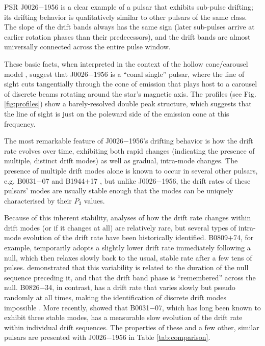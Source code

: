 \documentclass[linenumbers]{aastex631}
\newcommand{\psr}{J0026$-$1956}
\begin{document}
PSR \psr{} is a clear example of a pulsar that exhibits sub-pulse drifting; its drifting behavior is qualitatively similar to other pulsars of the same class.
The slope of the drift bands always has the same sign (later sub-pulses arrive at earlier rotation phases than their predecessors), and the drift bands are almost universally connected across the entire pulse window.

These basic facts, when interpreted in the context of the hollow cone/carousel model \citep{Ruderman1975,Rankin1986,Deshpande1999}, suggest that \psr{} is a ``conal single'' pulsar, where the line of sight cuts tangentially through the cone of emission that plays host to a carousel of discrete beams rotating around the star's magnetic axis.
The profiles (see Fig. \ref{fig:profiles}) show a barely-resolved double peak structure, which suggests that the line of sight is just on the poleward side of the emission cone at this frequency.

The most remarkable feature of \psr{}'s drifting behavior is how the drift rate evolves over time, exhibiting both rapid changes (indicating the presence of multiple, distinct drift modes) as well as gradual, intra-mode changes.
The presence of multiple drift modes alone is known to occur in several other pulsars, e.g. B0031$-$07 \citep{Huguenin1970,Joshi2000} and B1944$+$17 \citep{Deich1986,Kloumann2010}, but unlike \psr{}, the drift rates of these pulsars' modes are usually stable enough that the modes can be uniquely characterised by their $P_3$ values.

Because of this inherent stability, analyses of how the drift rate changes within drift modes (or if it changes at all) are relatively rare, but several types of intra-mode evolution of the drift rate have been historically identified.
B0809$+$74, for example, temporarily adopts a slightly lower drift rate immediately following a null, which then relaxes slowly back to the usual, stable rate after a few tens of pulses.
\citet{Lyne1983} demonstrated that this variability is related to the duration of the null sequence preceding it, and that the drift band phase is ``remembered'' across the null.
B0826$-$34, in contrast, has a drift rate that varies slowly but pseudo randomly at all times, making the identification of discrete drift modes impossible \citep[e.g.][]{Esamdin2012}.
More recently, \citet{McSweeney2017} showed that B0031$-$07, which has long been known to exhibit three stable modes, has a measurable slow evolution of the drift rate within individual drift sequences.
The properties of these and a few other, similar pulsars are presented with \psr{} in Table \ref{tab:comparison}.
\end{document}
